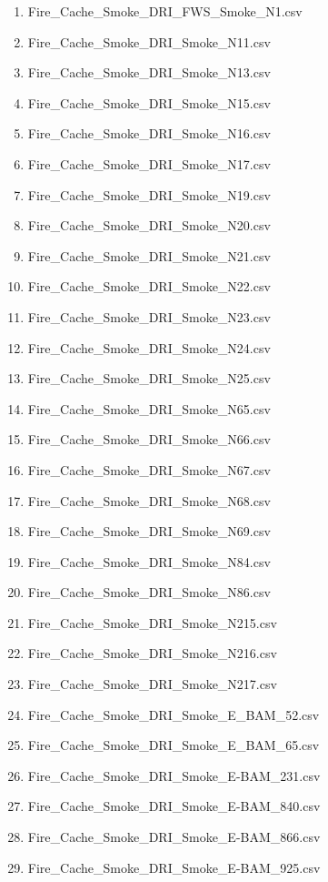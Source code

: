 \begin{enumerate}[nolistsep]
\item Fire\_Cache\_Smoke\_DRI\_FWS\_Smoke\_N1.csv
\item Fire\_Cache\_Smoke\_DRI\_Smoke\_N11.csv
\item Fire\_Cache\_Smoke\_DRI\_Smoke\_N13.csv
\item Fire\_Cache\_Smoke\_DRI\_Smoke\_N15.csv
\item Fire\_Cache\_Smoke\_DRI\_Smoke\_N16.csv
\item Fire\_Cache\_Smoke\_DRI\_Smoke\_N17.csv
\item Fire\_Cache\_Smoke\_DRI\_Smoke\_N19.csv
\item Fire\_Cache\_Smoke\_DRI\_Smoke\_N20.csv
\item Fire\_Cache\_Smoke\_DRI\_Smoke\_N21.csv
\item Fire\_Cache\_Smoke\_DRI\_Smoke\_N22.csv
\item Fire\_Cache\_Smoke\_DRI\_Smoke\_N23.csv
\item Fire\_Cache\_Smoke\_DRI\_Smoke\_N24.csv
\item Fire\_Cache\_Smoke\_DRI\_Smoke\_N25.csv
\item Fire\_Cache\_Smoke\_DRI\_Smoke\_N65.csv
\item Fire\_Cache\_Smoke\_DRI\_Smoke\_N66.csv
\item Fire\_Cache\_Smoke\_DRI\_Smoke\_N67.csv
\item Fire\_Cache\_Smoke\_DRI\_Smoke\_N68.csv
\item Fire\_Cache\_Smoke\_DRI\_Smoke\_N69.csv
\item Fire\_Cache\_Smoke\_DRI\_Smoke\_N84.csv
\item Fire\_Cache\_Smoke\_DRI\_Smoke\_N86.csv
\item Fire\_Cache\_Smoke\_DRI\_Smoke\_N215.csv
\item Fire\_Cache\_Smoke\_DRI\_Smoke\_N216.csv
\item Fire\_Cache\_Smoke\_DRI\_Smoke\_N217.csv
\item Fire\_Cache\_Smoke\_DRI\_Smoke\_E\_BAM\_52.csv
\item Fire\_Cache\_Smoke\_DRI\_Smoke\_E\_BAM\_65.csv
\item Fire\_Cache\_Smoke\_DRI\_Smoke\_E-BAM\_231.csv
\item Fire\_Cache\_Smoke\_DRI\_Smoke\_E-BAM\_840.csv
\item Fire\_Cache\_Smoke\_DRI\_Smoke\_E-BAM\_866.csv
\item Fire\_Cache\_Smoke\_DRI\_Smoke\_E-BAM\_925.csv

\end{enumerate}
